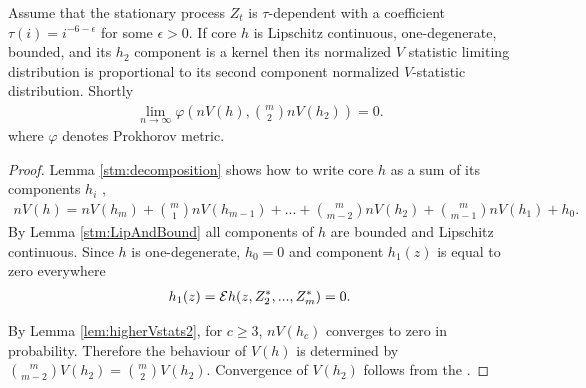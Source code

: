 \begin{lemma}
\label{lem:equivVanila}
Assume that the stationary process $Z_t$ is $\tau$-dependent with a coefficient $\tau(i) = i^{-6-\epsilon}$ for some $\epsilon>0$. If core $h$ is Lipschitz continuous, one-degenerate, bounded, and its $h_2$ component is a kernel then its normalized $V$ statistic limiting distribution is proportional to its second component normalized $V$-statistic distribution. Shortly    
\begin{align}
\lim_{n \to \infty} \varphi( n V(h), \binom m 2  n V(h_2) ) = 0. 
\end{align}
where $\varphi$ denotes Prokhorov metric. 
\end{lemma}
\begin{proof}
Lemma \ref{stm:decomposition} shows how to write core  $h$ as a sum of its components $h_i$ ,
\begin{align}
  n V(h) = n V(h_m) + \binom m 1 n V(h_{m-1}) + ...+ \binom {m} {m-2} n V(h_{2}) + \binom {m} {m-1} n V(h_{1})+h_0.
\end{align}
By Lemma \ref{stm:LipAndBound} all components of $h$ are bounded and Lipschitz continuous. Since $h$ is one-degenerate, $h_0=0$ and component $h_1(z)$ is equal to zero everywhere
\begin{align}
h_1(z) = \mathcal{E} h(z,Z_{2}^*,...,Z_{m}^*)=0. 
\end{align}

By Lemma \ref{lem:higherVstats2}, for $c \geq 3$, $n V(h_{c})$  converges to zero in probability. Therefore the behaviour of $V(h)$ is determined by $\binom {m} {m-2} V(h_2) = \binom {m} {2} V(h_2)$. Convergence of $V(h_2)$ follows from the \cite[Theorem 2.1]{leucht_dependent_2013}.
\end{proof}




